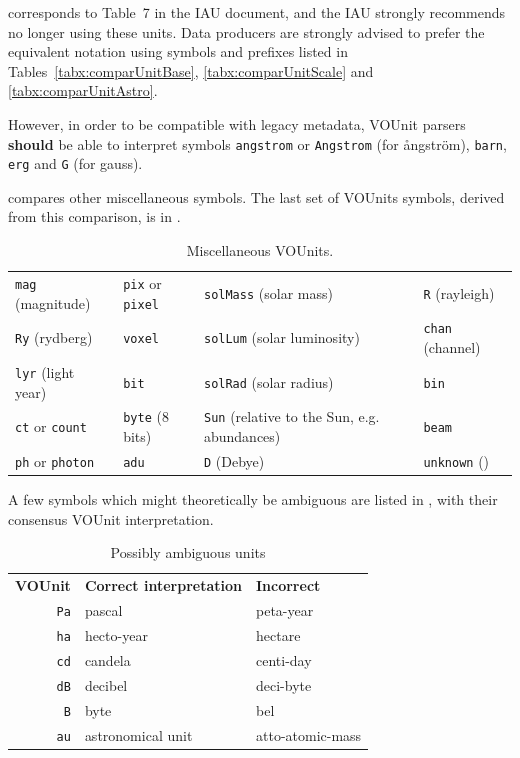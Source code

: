 \documentclass[11pt,a4paper]{ivoa}
\newcommand{\unit}[1]{\texttt{\small\color{orange}#1}}
\newcommand*\norm[1]{\textbf{\color{ivoacolor}#1}}
\begin{document}
 corresponds to Table~7 in the IAU document, and the IAU strongly
recommends no longer using these units.
Data producers are strongly advised to prefer the equivalent notation using symbols and prefixes listed in
Tables~\ref{tabx:comparUnitBase}, \ref{tabx:comparUnitScale} and \ref{tabx:comparUnitAstro}.

However, in order to be compatible with legacy metadata, VOUnit
parsers \norm{should} be able to interpret symbols \unit{angstrom}
or \unit{Angstrom} (for \aa{}ngstr\"om), \unit{barn}, \unit{erg}
and \unit{G} (for gauss).

 compares other miscellaneous symbols.
The last set of VOUnits symbols, derived from this comparison, is in
.

\begin{table}[ht]
\begin{center}
\def\arraystretch{1.2}
\begin{tabular}{|l|l|L{2.9cm}|l|}\hline
\unit{mag} (magnitude)		&\unit{pix}  or \unit{pixel} 	&\unit{solMass} (solar mass)     &\unit{R} (rayleigh) \\
\unit{Ry} (rydberg)		&\unit{voxel}    		&\unit{solLum} (solar luminosity)&\unit{chan} (channel) 	\\
\unit{lyr} (light year)		&\unit{bit}   			&\unit{solRad} (solar radius)	&\unit{bin} \\
\unit{ct} or \unit{count}	&\unit{byte} (8 bits)   	&\unit{Sun} (relative to the Sun, e.g. abundances)&\unit{beam} 	\\
\unit{ph} or \unit{photon} 	&\unit{adu}                     &\unit{D} (Debye)	&\unit{unknown} ()\\\hline
\end{tabular}
\end{center}
\caption[Miscellaneous VOUnits]
{\label{tab:voumisc}Miscellaneous VOUnits.}
\end{table}

A few symbols which might theoretically be ambiguous are listed in
,
with their consensus VOUnit interpretation.

\begin{table}[bht]
\begin{center}
\begin{tabular}{|r|l|l|}
\hline
\textbf{VOUnit}&\textbf{Correct interpretation}&\textbf{Incorrect}\\
\unit{Pa}&pascal&peta-year\\
\unit{ha}&hecto-year&hectare\\
\unit{cd}&candela&centi-day\\
\unit{dB}&decibel&deci-byte\\
\unit{B}&byte&bel\\
\unit{au}&astronomical unit&atto-atomic-mass\\
\hline
\end{tabular}
\end{center}
\caption{\label{tab:ambiguous}Possibly ambiguous units}
\end{table}
\end{document}
